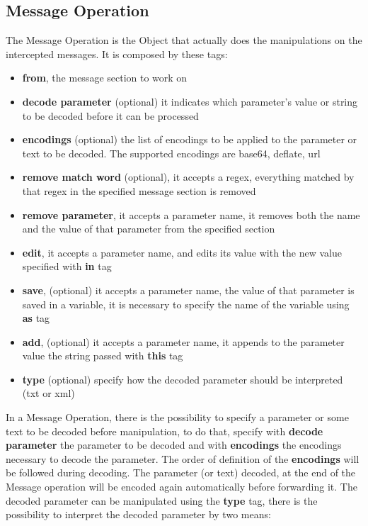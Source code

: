 \subsection{Message Operation}
The Message Operation is the Object that actually does the manipulations on the intercepted messages. It is composed by these tags:
\begin{itemize}
    \item \textbf{from}, the message section to work on
    \item \textbf{decode parameter} (optional) it indicates which parameter's value or string to be decoded before it can be processed
    \item \textbf{encodings} (optional) the list of encodings to be applied to the parameter or text to be decoded. The supported encodings are base64, deflate, url
    \item \textbf{remove match word} (optional), it accepts a regex, everything matched by that regex in the specified message section is removed
    \item \textbf{remove parameter}, it accepts a parameter name, it removes both the name and the value of that parameter from the specified section
    \item \textbf{edit}, it accepts a parameter name, and edits its value with the new value specified with \textbf{in} tag
    \item \textbf{save}, (optional) it accepts a parameter name, the value of that parameter is saved in a variable, it is necessary to specify the name of the variable using \textbf{as} tag
    \item \textbf{add}, (optional) it accepts a parameter name, it appends to the parameter value the string passed with \textbf{this} tag
    \item \textbf{type} (optional) specify how the decoded parameter should be interpreted (txt or xml)
\end{itemize}

In a Message Operation, there is the possibility to specify a parameter or some text to be decoded before manipulation, to do that, specify with \textbf{decode parameter} the parameter to be decoded and with \textbf{encodings} the encodings necessary to decode the parameter. The order of definition of the \textbf{encodings} will be followed during decoding. The parameter (or text) decoded, at the end of the Message operation will be encoded again automatically before forwarding it.
The decoded parameter can be manipulated using the \textbf{type} tag, there is the possibility to interpret the decoded parameter by two means: 

